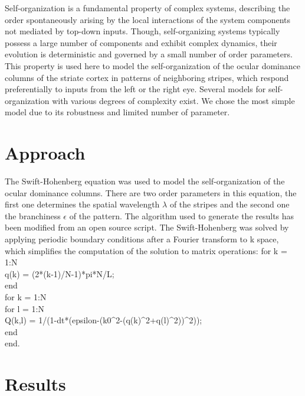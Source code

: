 \documentclass[twocolumn]{bmcart}%
\begin{document}
Self-organization is a fundamental property of complex systems,
describing the order spontaneously arising by the local interactions of
the system components not mediated by top-down inputs. Though,
self-organizing systems typically possess a large number of components
and exhibit complex dynamics, their evolution is deterministic and
governed by a small number of order parameters. This property is used
here to model the self-organization of the ocular dominance columns of
the striate cortex in patterns of neighboring stripes, which respond
preferentially to inputs from the left or the right eye. Several models
for self-organization with various degrees of complexity exist. We chose 
the most simple model due to its robustness and limited number of parameter.

\section{Approach}\label{approach}

The Swift-Hohenberg equation \cite{Hohenberg1992} was used to model the 
self-organization of the ocular dominance columns. There are two order 
parameters in this equation, the first one determines the spatial wavelength 
\(\lambda\) of the stripes and the second one the branchiness \(\epsilon\) 
of the pattern. The algorithm used to generate the results has been modified
from an open source script. The Swift-Hohenberg was solved by applying periodic
boundary conditions after a Fourier transform to k space, which simplifies the 
computation of the solution to matrix operations:
\newline
\newline
for k = 1:N\\
\hphantom{15} q(k) = (2*(k-1)/N-1)*pi*N/L;\\
end\\
\newline
for k = 1:N\\
\hphantom{7}for l = 1:N\\
\hphantom{50}    Q(k,l) = 1/(1-dt*(epsilon-(k0\textasciicircum{2}-(q(k)\textasciicircum{2}+q(l)\textasciicircum{2}))\textasciicircum{2}));\\
\hphantom{7}end\\
end.

\section{Results}\label{results}
\end{document}
